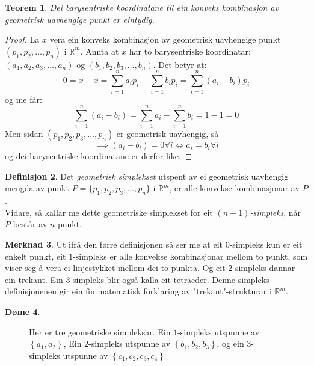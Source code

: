 \documentclass[a4paper, 12pt, norsk]{article}
\theoremstyle{plain}
\newtheorem{theorem}{Teorem}[section]
\theoremstyle{definition}
\newtheorem{definition}[theorem]{Definisjon}
\newtheorem{example}[theorem]{Døme}
\newtheorem{remark}[theorem]{Merknad}
\newcommand{\Rb}{\mathbb{R}}
\newcommand{\set}[1]{ \left \{ #1 \right \} } %
\newcommand{\tuple}[1]{ \left( #1 \right) } %
\begin{document}
\begin{theorem} \label{thm:unik-barysentrisk-koordinat}
	Dei barysentriske koordinatane til ein konveks kombinasjon av geometrisk uavhengige punkt er eintydig.
\end{theorem}

\begin{proof}
	La $x$ vera ein konveks kombinasjon av geometrisk uavhengige punkt \( \tuple{p_1, p_2, \dots, p_n} \) i $\Rb^m$. Annta at $x$ har to barysentriske koordinatar: $(a_1, a_2, a_3, \dots, a_n)$ og $(b_1, b_2, b_3, \dots, b_n)$. Det betyr at:
	\begin{equation*}
		0 = x - x = \sum_{i=1}^n a_ip_i - \sum_{i=1}^n b_ip_i=\sum_{i=1}^n (a_i-b_i)p_i
	\end{equation*}
	og me får:
	\begin{equation*}
		\sum_{i=1}^n(a_i-b_i)=\sum_{i=1}^na_i - \sum_{i=1}^nb_i = 1 - 1 = 0
	\end{equation*}
	Men sidan $(p_1, p_2, p_3, \dots, p_n)$ er geometrisk uavhengig, så 
	\begin{equation*}
		\implies (a_i-b_i)=0\forall i \Longleftrightarrow a_i = b_i \forall i
	\end{equation*}
	og dei barysentriske koordinatane er derfor like.
\end{proof}

\begin{definition}
	Det \emph{geometrisk simplekset} utspent av ei geometrisk uavhengig mengda av punkt $P=\{p_1, p_2, p_3, \dots, p_n\}$ i $\Rb^m$, er alle konvekse kombinasjonar av $P$.
	\\Vidare, så kallar me dette geometriske simplekset for eit \emph{$(n-1)$-simpleks}, når $P$ består av $n$ punkt.
\end{definition}

\begin{remark}
	Ut ifrå den førre definisjonen så ser me at eit $0$-simpleks kun er eit enkelt punkt, eit $1$-simpleks er alle konvekse kombinasjonar mellom to punkt, som viser seg å vera ei linjestykket mellom dei to punkta. Og eit $2$-simpleks dannar ein trekant. Ein $3$-simpleks blir også kalla eit tetraeder. Denne simpleks definisjonenen gir ein fin matematisk forklaring av "trekant"-strukturar i $\Rb^m$.
\end{remark}

\begin{example}
	\phantom{123}
	\begin{figure}[htbp]
		\begin{center}
			
			\caption{Her er tre geometriske simpleksar. Ein \( 1 \)-simpleks utspunne av \( \set{a_1, a_2} \), Ein \(2\)-simpleks utspunne av \( \set{b_1, b_2, b_3} \), og ein \(3\)-simpleks utspunne av \( \set{c_1, c_2, c_3, c_4} \)}
		\end{center}
	\end{figure}
\end{example}
\end{document}
